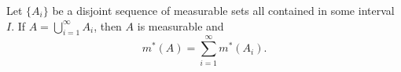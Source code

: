 \begin{lemma}[Lemma 3.13]
Let $\{A_i\}$ be a disjoint sequence of measurable sets all contained in some interval $I$. If $A = \bigcup_{i=1}^{\infty} A_i$, then $A$ is measurable and
$$
m^*(A) = \sum_{i=1}^{\infty} m^*(A_i).
$$
\end{lemma}
